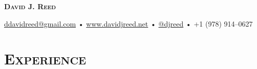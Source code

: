 \documentclass{article}
\begin{document}
\raggedright

\thispagestyle{empty}

\begin{center}
  {\LARGE\textsc{\textbf{David J. Reed}}}
\end{center}

\begin{center}
  \href{mailto:ddavidreed@gmail.com}{ddavidreed@gmail.com} • \href{https://www.davidjreed.net/}{www.davidjreed.net} • \href{https://github.com/djreed}{@djreed} • +1 (978) 914--0627 \\
  \hrulefill
\end{center}

\section*{\textsc{Experience}}
\end{document}
